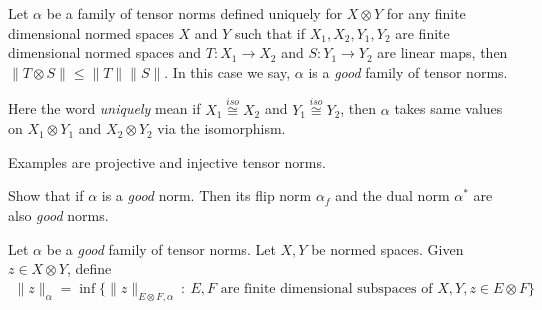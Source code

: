 

\begin{definition}
  Let $\alpha$ be a family of tensor norms defined uniquely for $X
  \otimes Y$ for any finite dimensional normed spaces $X$ and $Y$
  such that if $X_1, X_2, Y_1, Y_2$ are finite dimensional normed
  spaces and $T : X_1 \to X_2$  and $S : Y_1 \to Y_2$ are linear
  maps, then $ \|T \otimes S\| \le \|T\|\|S\|$. In this case we say,
  $\alpha$ is a \textit{good} family of tensor norms.

  Here the word \textit{uniquely} mean if $X_1 \stackrel{iso}{\cong}
  X_2$ and $Y_1 \stackrel{iso}{\cong} Y_2$, then $\alpha$ takes same
  values on $X_1 \otimes Y_1$ and $X_2 \otimes Y_2$ via the isomorphism.

  Examples are projective and injective tensor norms.
\end{definition}

\begin{exercise}
  Show that if $\alpha$ is a \textit{good} norm. Then its flip norm
  $\alpha_f$ and the dual norm $\alpha^*$ are also \textit{good} norms.
\end{exercise}

\begin{definition}
  Let $\alpha$ be a \textit{good} family of tensor norms. Let $X, Y$
  be normed spaces. Given $z \in X \otimes Y$, define
  \begin{align*}
    \|z\|_\alpha = \inf \{ \|z\|_{E \otimes F, \alpha}  \ : \    E, F
    \textrm{ are finite dimensional subspaces of } X, Y, z \in E \otimes F \}
  \end{align*}
\end{definition}

